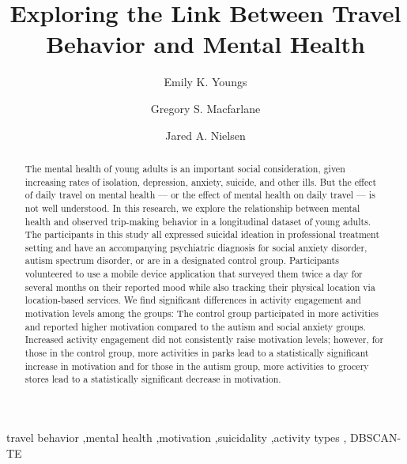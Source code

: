 \documentclass[
  letterpaper,
  number,
  review,
  3p]{elsarticle}
\begin{document}
\begin{frontmatter}
\title{Exploring the Link Between Travel Behavior and Mental Health}
\author[1]{Emily K. Youngs%
%
}
\author[1]{Gregory S. Macfarlane%
%
}
\author[2]{Jared A. Nielsen%
%
}





        
\begin{abstract}
The mental health of young adults is an important social consideration,
given increasing rates of isolation, depression, anxiety, suicide, and
other ills. But the effect of daily travel on mental health --- or the
effect of mental health on daily travel --- is not well understood. In
this research, we explore the relationship between mental health and
observed trip-making behavior in a longitudinal dataset of young adults.
The participants in this study all expressed suicidal ideation in
professional treatment setting and have an accompanying psychiatric
diagnosis for social anxiety disorder, autism spectrum disorder, or are
in a designated control group. Participants volunteered to use a mobile
device application that surveyed them twice a day for several months on
their reported mood while also tracking their physical location via
location-based services. We find significant differences in activity
engagement and motivation levels among the groups: The control group
participated in more activities and reported higher motivation compared
to the autism and social anxiety groups. Increased activity engagement
did not consistently raise motivation levels; however, for those in the
control group, more activities in parks lead to a statistically
significant increase in motivation and for those in the autism group,
more activities to grocery stores lead to a statistically significant
decrease in motivation.
\end{abstract}





\begin{keyword}
    travel behavior \sep mental
health \sep motivation \sep suicidality \sep activity types \sep 
    DBSCAN-TE
\end{keyword}
\end{frontmatter}
    
\end{document}
